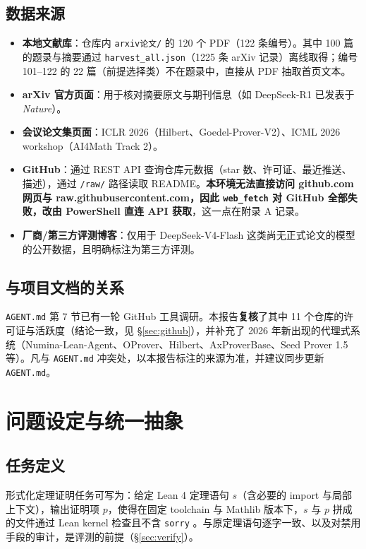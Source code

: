 \documentclass[UTF8,a4paper,11pt,fontset=windows]{ctexart}
\newcommand{\code}[1]{\texttt{#1}}
\begin{document}
\subsection{数据来源}

\begin{itemize}
  \item \textbf{本地文献库}：仓库内 \code{arxiv论文/} 的 120 个 PDF（122 条编号）。其中 100 篇的题录与摘要通过 \code{harvest\_all.json}（1225 条 arXiv 记录）离线取得；编号 101--122 的 22 篇（前提选择类）不在题录中，直接从 PDF 抽取首页文本。
  \item \textbf{arXiv 官方页面}：用于核对摘要原文与期刊信息（如 DeepSeek-R1 已发表于 \emph{Nature}）。
  \item \textbf{会议论文集页面}：ICLR 2026（Hilbert、Goedel-Prover-V2）、ICML 2026 workshop（AI4Math Track 2）。
  \item \textbf{GitHub}：通过 REST API 查询仓库元数据（star 数、许可证、最近推送、描述），通过 \code{/raw/} 路径读取 README。\textbf{本环境无法直接访问 github.com 网页与 raw.githubusercontent.com，因此 \code{web\_fetch} 对 GitHub 全部失败，改由 PowerShell 直连 API 获取}，这一点在附录 A 记录。
  \item \textbf{厂商/第三方评测博客}：仅用于 DeepSeek-V4-Flash 这类尚无正式论文的模型的公开数据，且明确标注为第三方评测。
\end{itemize}

\subsection{与项目文档的关系}

\code{AGENT.md} 第 7 节已有一轮 GitHub 工具调研。本报告\textbf{复核}了其中 11 个仓库的许可证与活跃度（结论一致，见 \S\ref{sec:github}），并补充了 2026 年新出现的代理式系统（Numina-Lean-Agent、OProver、Hilbert、AxProverBase、Seed Prover 1.5 等）。凡与 \code{AGENT.md} 冲突处，以本报告标注的来源为准，并建议同步更新 \code{AGENT.md}。

\section{问题设定与统一抽象}

\subsection{任务定义}

形式化定理证明任务可写为：给定 Lean 4 定理语句 $s$（含必要的 import 与局部上下文），输出证明项 $p$，使得在固定 toolchain 与 Mathlib 版本下，$s$ 与 $p$ 拼成的文件通过 Lean kernel 检查且不含 \code{sorry} \cite{lean4,mathlib}。与原定理语句逐字一致、以及对禁用手段的审计，是评测的前提（\S\ref{sec:verify}）。
\end{document}
